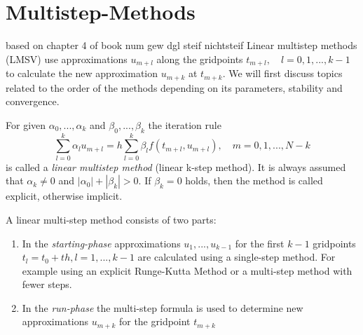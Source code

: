 	
		
	
			
\section{Multistep-Methods}
	based on chapter 4 of book num gew dgl steif nichtsteif \newline
	Linear multistep methods (LMSV) use approximations $u_{m+l}$ along the gridpoints $t_{m+l}, \quad l=0,1,...,k-1$ to calculate the new approximation $u_{m+k}$ at $t_{m+k}$. We will first discuss topics related to the order of the methods depending on its parameters, stability and convergence.
	
	\begin{definition}
		For given $\alpha_0, ..., \alpha_k$ and $\beta_0, ..., \beta_k$ the iteration rule
		\begin{equation}
			\label{linear-multistep-method}
			\sum_{l=0}^{k} \alpha_l u_{m+l} = h \sum_{l=0}^{k} \beta_l f(t_{m+l}, u_{m+l}), \quad m=0,1,...,N-k
		\end{equation}
		is called a \emph{linear multistep method} (linear k-step method). It is always assumed that $\alpha_k \neq 0$ and $|\alpha_0| + |\beta_k| > 0$. If $\beta_k=0$ holds, then the method is called explicit, otherwise implicit.
	\end{definition}
	
	A linear multi-step method consists of two parts:
	\begin{enumerate}
		\item In the \emph{starting-phase} approximations $u_1,...,u_{k-1}$ for the first $k-1$ gridpoints $t_l = t_0+th, l=1,...,k-1$ are calculated using a single-step method. For example using an explicit Runge-Kutta Method or a multi-step method with fewer steps.
		
		\item  In the \emph{run-phase} the multi-step formula is used to determine new approximations $u_{m+k}$ for the gridpoint $t_{m+k}$
	\end{enumerate}
	
